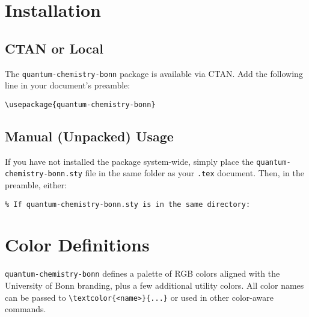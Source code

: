 \documentclass[a4paper,12pt]{article}
\begin{document}
\section{Installation}
\label{sec:installation}

\subsection{CTAN or Local }
 The \texttt{quantum-chemistry-bonn} package is available via CTAN.
 Add the following line in your document’s preamble:
\begin{verbatim}
\usepackage{quantum-chemistry-bonn}
\end{verbatim}

\subsection{Manual (Unpacked) Usage}
If you have not installed the package system-wide, simply place the \texttt{quantum-chemistry-bonn.sty} file in the same folder as your \texttt{.tex} document. Then, in the preamble, either:
\begin{verbatim}
% If quantum-chemistry-bonn.sty is in the same directory:

\end{verbatim}


\section{Color Definitions}
\label{sec:colors}
\texttt{quantum-chemistry-bonn} defines a palette of RGB colors aligned with the University of Bonn branding, plus a few additional utility colors. All color names can be passed to \verb|\textcolor{<name>}{...}| or used in other color-aware commands.
\end{document}
